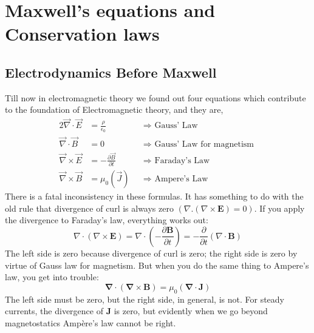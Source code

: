 \chapter{Maxwell's equations and Conservation laws}
\section{Electrodynamics Before Maxwell}
Till now in electromagnetic theory we found out four equations which contribute to the foundation of Electromagnetic theory, and they are,
\begin{align*}{2}
\vec{\nabla} \cdot \vec{E}&=\frac{\rho}{\epsilon_{0}} \quad && \Rightarrow \text { Gauss' Law }  \\
\vec{\nabla} \cdot \vec{B}&=0 \quad && \Rightarrow \text { Gauss' Law for magnetism } \\
\vec{\nabla} \times \vec{E}&=-\frac{\partial \vec{B}}{\partial t} && \Rightarrow \text { Faraday's Law } \\
\vec{\nabla} \times \vec{B}&=\mu_{0}\left(\vec{J}\right) && \Rightarrow \text { Ampere's Law }
\end{align*}
There is a fatal inconsistency in these formulas. It has something to do with the old rule that divergence of curl is always zero $ (\nabla .(\nabla \times \mathbf{E})=0)$. If you apply the divergence to Faraday's law, everything works out: 
$$\nabla \cdot(\nabla \times \mathbf{E})=\nabla \cdot\left(-\frac{\partial \mathbf{B}}{\partial t}\right)=-\frac{\partial}{\partial t}(\nabla \cdot \mathbf{B})$$
The left side is zero because divergence of curl is zero; the right side is zero by virtue of Gauss law for magnetism. But when you do the same thing to Ampere's law, you get into trouble:$$\boldsymbol{\nabla} \cdot(\boldsymbol{\nabla} \times \mathbf{B})=\mu_{0}(\boldsymbol{\nabla} \cdot \mathbf{J})$$ The left side must be zero, but the right side, in general, is not. For steady currents, the divergence of $\mathbf{J}$ is zero, but evidently when we go beyond magnetostatics Ampère's law cannot be right.
